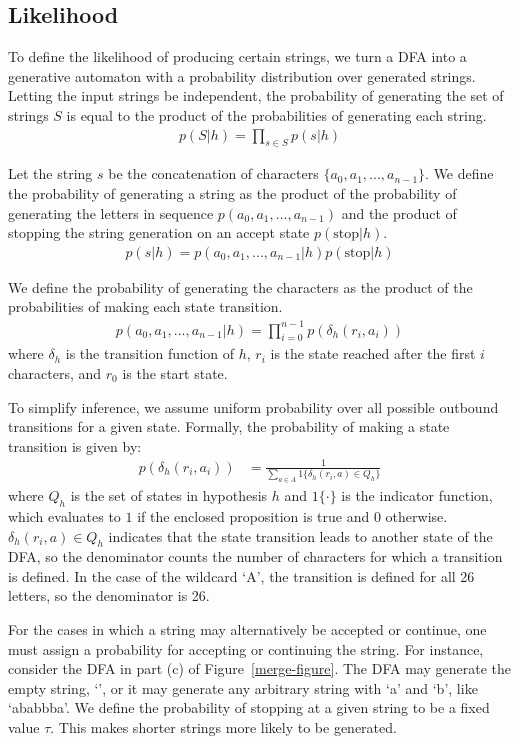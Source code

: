 \documentclass[10pt,letterpaper]{article}
\begin{document}
\subsection{Likelihood}
To define the likelihood of producing certain strings, we turn a DFA into a generative automaton with a probability distribution over generated strings. Letting the input strings be independent, the probability of generating the set of strings $S$ is equal to the product of the probabilities of generating each string.
\begin{align*}
	p(S|h) = \prod_{s \in S} p(s|h)
\end{align*}

Let the string $s$ be the concatenation of characters $\{a_0,a_1,...,a_{n-1}\}$. We define the probability of generating a string as the product of the probability of generating the letters in sequence $p(a_0,a_1,...,a_{n-1})$ and the product of stopping the string generation on an accept state $p(\text{stop}|h)$.
\begin{align*}
	p(s|h) = p(a_0,a_1,...,a_{n-1}|h)p(\text{stop}|h)
\end{align*}

We define the probability of generating the characters as the product of the probabilities of making each state transition.
\begin{align*}
	p(a_0, a_1, ..., a_{n-1}|h) = \prod_{i=0}^{n-1}p(\delta_h(r_i, a_i))
\end{align*}
where $\delta_h$ is the transition function of $h$, $r_i$ is the state reached after the first $i$ characters, and $r_0$ is the start state.


To simplify inference, we assume uniform probability over all possible outbound transitions for a given state. Formally, the probability of making a state transition is given by:
\begin{align*}
	p(\delta_h(r_i, a_i)) &= \frac{1}{\sum_{a\in A} 1\{\delta_h(r_i, a)\in Q_h\}}
\end{align*}
where $Q_h$ is the set of states in hypothesis $h$ and $1\{\cdot\}$ is the indicator function, which evaluates to $1$ if the enclosed proposition is true and $0$ otherwise. $\delta_h(r_i, a)\in Q_h$ indicates that the state transition leads to another state of the DFA, so the denominator counts the number of characters for which a transition is defined. In the case of the wildcard `A', the transition is defined for all 26 letters, so the denominator is 26.

For the cases in which a string may alternatively be accepted or continue, one must assign a probability for accepting or continuing the string. For instance, consider the DFA in part (c) of Figure~\ref{merge-figure}. The DFA may generate the empty string, `', or it may generate any arbitrary string with `a' and `b', like `ababbba'. We define the probability of stopping at a given string to be a fixed value $\tau$. This makes shorter strings more likely to be generated.
\end{document}
